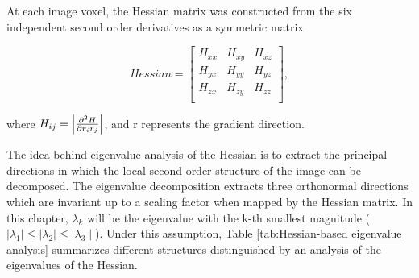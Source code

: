 {At each image voxel, the Hessian matrix was constructed from the six independent second order derivatives as a symmetric matrix

\begin{equation}
 \label{eq:FissureDetection4}
 Hessian = \begin{bmatrix} H_{xx} & H_{xy} & H_{xz} \\ H_{yx} & H_{yy} & H_{yz} \\ H_{zx} & H_{zy} & H_{zz} \\ \end{bmatrix},
\end{equation}

\noindent where $H_{ij} = \begin{vmatrix} \pd[2]{H}{r_i r_j} \\ \end{vmatrix}$, and r represents the gradient direction.

The idea behind eigenvalue analysis of the Hessian is to extract the principal directions in which the local second order structure of the image can be decomposed. The eigenvalue decomposition extracts three orthonormal directions which are invariant up to a scaling factor when mapped by the Hessian matrix. In this chapter, $\lambda_k$ will be the eigenvalue with the k-th smallest magnitude ($\mid\lambda_{1}\mid\leq\mid\lambda_{2}\mid\leq\mid\lambda_{3}\mid$). Under this assumption, Table \ref{tab:Hessian-based eigenvalue analysis} summarizes different structures distinguished by an analysis of the eigenvalues of the Hessian.

}
